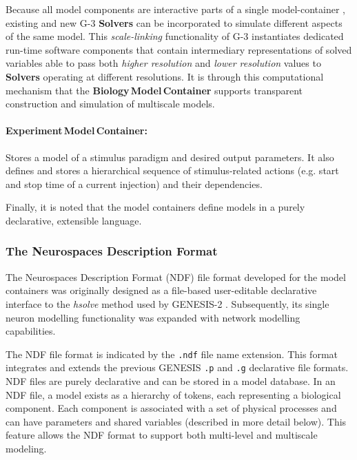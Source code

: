 \documentclass[11pt,3p,twocolumn]{JMN}
\begin{document}
Because all model components are interactive parts of a single model-container \cite{cornelis12}, existing and new G-3 {\bf Solvers} can be incorporated to simulate different aspects of the same model.  This {\em scale-linking} functionality of G-3 instantiates dedicated run-time software components that contain intermediary representations of solved variables able to pass both {\em higher resolution} and {\em lower resolution} values to {\bf Solvers} operating at different resolutions.
It is through this computational mechanism that the {\bf Biology\,Model\,Container} supports transparent construction and simulation of multiscale models.

\paragraph{Experiment\,Model\,Container:} Stores a model of a stimulus paradigm and desired output parameters. It also defines and stores a hierarchical sequence of stimulus-related
actions (e.g. start and stop time of a current injection) and their dependencies.

Finally, it is noted that the model containers define models in a purely declarative,
extensible language.

\subsubsection{The Neurospaces Description Format}

The Neurospaces Description Format (NDF) file format developed for the model containers was originally designed as a file-based user-editable declarative interface to the {\it hsolve} method used by GENESIS-2 \cite{cornelis03:_inter_model_space_simul_space,beeman12:_years_comput_neuros}. Subsequently, its single neuron modelling functionality was expanded with network modelling capabilities.

The NDF file format is indicated by the {\tt .ndf} file name extension. This format integrates and extends the previous GENESIS {\tt .p} and {\tt .g} declarative file formats. NDF files are purely declarative and can be stored in a model database. In an NDF file, a
model exists as a hierarchy of tokens, each representing a biological component.  Each component is associated with a set of physical processes and can have parameters and shared variables (described in more detail below).  This feature allows the NDF format to support
both multi-level and multiscale modeling.
\end{document}
